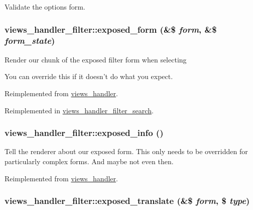 Validate the options form. \hypertarget{classviews__handler__filter_f97b055d96353032bebd186c66bbb5eb}{
\subsubsection[{exposed\_\-form}]{\setlength{\rightskip}{0pt plus 5cm}views\_\-handler\_\-filter::exposed\_\-form (\&\$ {\em form}, \/  \&\$ {\em form\_\-state})}}
\label{classviews__handler__filter_f97b055d96353032bebd186c66bbb5eb}


Render our chunk of the exposed filter form when selecting

You can override this if it doesn't do what you expect. 

Reimplemented from \hyperlink{classviews__handler_657fbb873c6be9e1da904e2aad191f66}{views\_\-handler}.

Reimplemented in \hyperlink{classviews__handler__filter__search_fc00db448aa56fcd91e9ab0dbbe7d1ac}{views\_\-handler\_\-filter\_\-search}.\hypertarget{classviews__handler__filter_5405764212dfafae60fa032c217461b4}{
\subsubsection[{exposed\_\-info}]{\setlength{\rightskip}{0pt plus 5cm}views\_\-handler\_\-filter::exposed\_\-info ()}}
\label{classviews__handler__filter_5405764212dfafae60fa032c217461b4}


Tell the renderer about our exposed form. This only needs to be overridden for particularly complex forms. And maybe not even then. 

Reimplemented from \hyperlink{classviews__handler_2f16176116ecd86a8f8c60a2bc1ebd54}{views\_\-handler}.\hypertarget{classviews__handler__filter_08e8d0f9aa1a45ee427f1a8ec63fca91}{
\subsubsection[{exposed\_\-translate}]{\setlength{\rightskip}{0pt plus 5cm}views\_\-handler\_\-filter::exposed\_\-translate (\&\$ {\em form}, \/  \$ {\em type})}}
\label{classviews__handler__filter_08e8d0f9aa1a45ee427f1a8ec63fca91}


